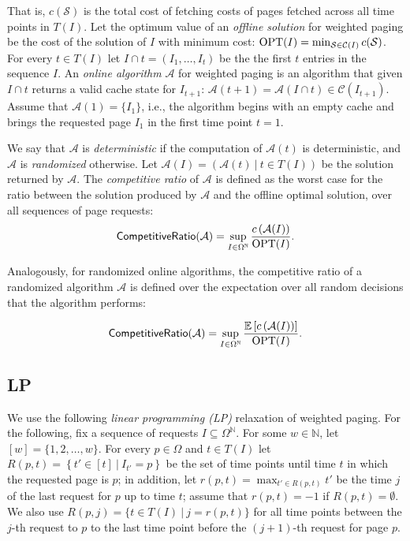 \documentclass[11pt]{article}
\newcommand{\cA}{{\mathcal{A}}}
\newcommand{\cC}{{\mathcal{C}}}
\newcommand{\cS}{{\mathcal{S}}}
\newcommand{\OPT}{\textnormal{OPT}}
\newcommand{\E}{{\mathbb{E}}}
\newcommand{\om}{{\Omega}}
\begin{document}
{That is, $c(\cS)$ is the total cost of fetching costs of pages fetched across all time points in $T(I)$. Let the optimum value of an {\em offline solution} for weighted paging be the cost of the solution of $I$ with minimum cost: $\OPT(I) = \min_{\cS \in \cC(I)} c(\cS)$. For every $t \in T(I)$ let $I\cap t = \left(I_1,\ldots, I_t\right)$ be the the first $t$ entries in the sequence $I$.  An {\em online algorithm} $\cA$ for weighted paging is an algorithm that given $I \cap t$ returns a valid cache state for $I_{t+1}$: $\cA(t+1) = \cA(I \cap t) \in \cC(I_{t+1})$. %
Assume that $\cA(1) = \{I_1\}$, i.e., the algorithm begins with an empty cache and brings the requested page $I_1$ in the first time point $t = 1$. %

We say that $\cA$ is {\em deterministic} if the computation of $\cA(t)$ is deterministic, and $\cA$ is {\em randomized} otherwise. Let $\cA(I) = \left(\cA(t)~|~t \in T(I) \right)$ be the solution returned by $\cA$. The {\em competitive ratio} of $\cA$ is defined as the worst case for the ratio between the solution produced by $\cA$ and the offline optimal solution, over all sequences of page requests: 
$$\textsf{CompetitiveRatio}(\cA) = \sup_{I \in \om^{\mathbb{N}}} \frac{c \left(\cA(I) \right)}{\OPT(I)}.$$

Analogously, for randomized online algorithms, the competitive ratio of a randomized algorithm $\cA$ is defined over the expectation over all random decisions that the algorithm performs:

$$\textsf{CompetitiveRatio}(\cA) = \sup_{I \in \om^{\mathbb{N}}} \frac{\E \left[ c \left(\cA(I) \right) \right]}{\OPT(I)}.$$

\subsection{LP}

We use the following {\em linear programming (LP)} relaxation of weighted paging. For the following, fix a sequence of requests $I \subseteq \om^{\mathbb{N}}$. For some $w \in \mathbb{N}$, let $[w] = \{1,2,\ldots,w\}$. For every $p \in \om$ and $t \in T(I)$ let $R(p,t) = \left\{ t' \in [t]~|~I_{t'} = p \right\}$ be the set of time points until time $t$ in which the requested page is $p$; in addition, let $r(p,t) = \max_{t' \in R(p,t)} t'$ be the time $j$ of the last request for $p$ up to time $t$; assume that $r(p,t) = -1$ if $R(p,t) = \emptyset$. We also use $R(p,j) = \{t \in T(I)~|~j = r(p,t)\}$ for all time points between the $j$-th request to $p$ to the last time point before the $(j+1)$-th request for page $p$. 

}
\end{document}
